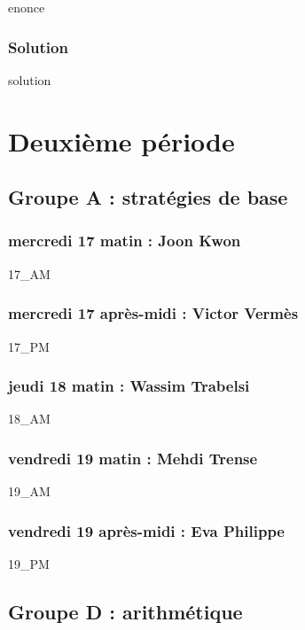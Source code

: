 \documentclass[12pt,A4]{book}
\theoremstyle{definition}
\theoremstyle{thm}
\theoremstyle{def}
\newcounter{sol}[subsection]
\newif\ifcourt
\begin{document}
{enonce}

\subsection{Solution}

{solution}


 \ifcourt
\else
\chapter{Deuxième période}
\minitoc \bigskip




\section {Groupe A : stratégies de base}

\subsection{mercredi 17 matin : Joon Kwon}

{17_AM}

\subsection{mercredi 17 après-midi : Victor Vermès}

{17_PM}

\subsection{jeudi 18 matin : Wassim Trabelsi}

{18_AM}

\subsection{vendredi 19 matin : Mehdi Trense}

{19_AM}

\subsection{vendredi 19 après-midi : Eva Philippe}

{19_PM}


\section {Groupe D : arithmétique}
\end{document}

